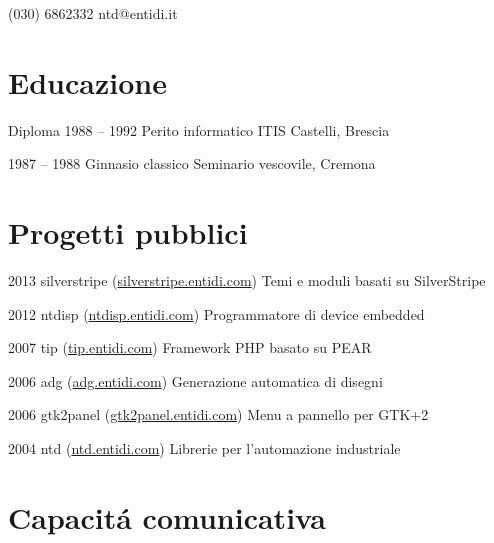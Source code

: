 \documentclass[fontsize=10pt]{tccv}
\begin{document}
    {(030) 6862332}
    {ntd@entidi.it}

\section{Educazione}

\begin{yearlist}

\item[Diploma]{1988 -- 1992}
     {Perito informatico}
     {ITIS Castelli, Brescia}

\item{1987 -- 1988}
     {Ginnasio classico}
     {Seminario vescovile, Cremona}

\end{yearlist}

\section{Progetti pubblici}

\begin{yearlist}

\item{2013}
     {silverstripe (\href{http://silverstripe.entidi.com/}{silverstripe.entidi.com})}
     {Temi e moduli basati su SilverStripe}

\item{2012}
     {ntdisp (\href{http://ntdisp.entidi.com/}{ntdisp.entidi.com})}
     {Programmatore di device embedded}

\item{2007}
     {tip (\href{http://tip.entidi.com/}{tip.entidi.com})}
     {Framework PHP basato su PEAR}

\item{2006}
     {adg (\href{http://adg.entidi.com/}{adg.entidi.com})}
     {Generazione automatica di disegni}

\item{2006}
     {gtk2panel (\href{http://gtk2panel.entidi.com/}{gtk2panel.entidi.com})}
     {Menu a pannello per GTK+2}

\item{2004}
     {ntd (\href{http://ntd.entidi.com/}{ntd.entidi.com})}
     {Librerie per l'automazione industriale}

\end{yearlist}

\section{Capacit\'a comunicativa}
\end{document}
